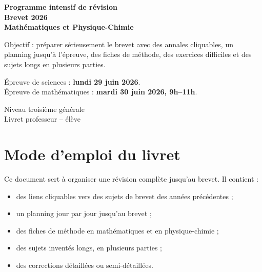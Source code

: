 \documentclass[11pt,a4paper]{article}
\newcounter{exercice}
\newcounter{correction}
\begin{document}
\begin{titlepage}
\centering
\vspace*{1.1cm}

{\Huge \textbf{Programme intensif de révision}}\\[0.3cm]
{\Huge \textbf{Brevet 2026}}\\[0.8cm]

{\LARGE \textbf{Mathématiques et Physique-Chimie}}\\[1cm]

\begin{tcolorbox}[colframe=bleu,colback=blue!3!white,width=0.92\textwidth]
\centering
\Large
Objectif : préparer sérieusement le brevet avec des annales cliquables, un planning jusqu'à l'épreuve, des fiches de méthode, des exercices difficiles et des sujets longs en plusieurs parties.
\end{tcolorbox}

\vspace{0.8cm}

\begin{tcolorbox}[colframe=rouge,colback=red!3!white,width=0.92\textwidth,title=Échéances principales]
\Large
Épreuve de sciences : \textbf{lundi 29 juin 2026}.\\
Épreuve de mathématiques : \textbf{mardi 30 juin 2026, 9h--11h}.
\end{tcolorbox}

\vfill

{\Large Niveau troisième générale}\\[0.2cm]
{\Large Livret professeur -- élève}\\[0.5cm]

\end{titlepage}

\tableofcontents
\newpage
\section{Mode d'emploi du livret}

\begin{objectif}
Ce document sert à organiser une révision complète jusqu'au brevet. Il contient :
\begin{itemize}
  \item des liens cliquables vers des sujets de brevet des années précédentes ;
  \item un planning jour par jour jusqu'au brevet ;
  \item des fiches de méthode en mathématiques et en physique-chimie ;
  \item des sujets inventés longs, en plusieurs parties ;
  \item des corrections détaillées ou semi-détaillées.
\end{itemize}
\end{objectif}
\end{document}
